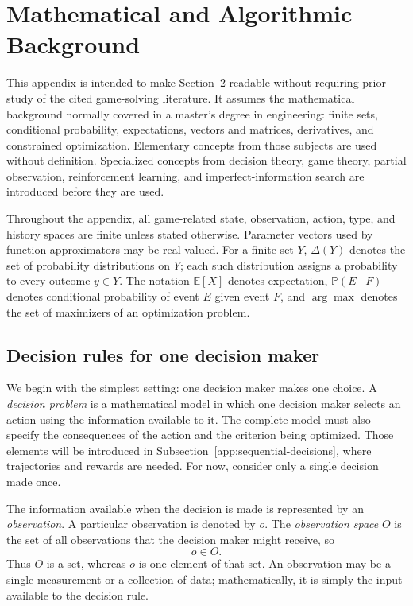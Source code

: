 \section{Mathematical and Algorithmic Background}

This appendix is intended to make Section~2 readable without requiring prior study of the cited game-solving literature. It assumes the mathematical background normally covered in a master's degree in engineering: finite sets, conditional probability, expectations, vectors and matrices, derivatives, and constrained optimization. Elementary concepts from those subjects are used without definition. Specialized concepts from decision theory, game theory, partial observation, reinforcement learning, and imperfect-information search are introduced before they are used.

Throughout the appendix, all game-related state, observation, action, type, and history spaces are finite unless stated otherwise. Parameter vectors used by function approximators may be real-valued. For a finite set $Y$, \(\Delta(Y)\) denotes the set of probability distributions on $Y$; each such distribution assigns a probability to every outcome $y\in Y$. The notation \(\mathbb{E}[X]\) denotes expectation, \(\mathbb{P}(E\mid F)\) denotes conditional probability of event $E$ given event $F$, and \(\arg\max\) denotes the set of maximizers of an optimization problem.


\subsection{Decision rules for one decision maker}

We begin with the simplest setting: one decision maker makes one choice. A \emph{decision problem} is a mathematical model in which one decision maker selects an action using the information available to it. The complete model must also specify the consequences of the action and the criterion being optimized. Those elements will be introduced in Subsection~\ref{app:sequential-decisions}, where trajectories and rewards are needed. For now, consider only a single decision made once.

The information available when the decision is made is represented by an \emph{observation}. A particular observation is denoted by $o$. The \emph{observation space} $O$ is the set of all observations that the decision maker might receive, so
\[
    o\in O.
\]
Thus $O$ is a set, whereas $o$ is one element of that set. An observation may be a single measurement or a collection of data; mathematically, it is simply the input available to the decision rule.

